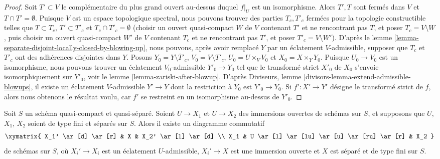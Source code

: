 \begin{proof}
Soit $T' \subset V$ le complémentaire du plus grand ouvert au-dessus duquel
$f|_U$ est un isomorphisme. Alors $T', T$ sont fermés dans $V$ et
$T \cap T' = \emptyset$. Puisque $V$ est un espace topologique
spectral, nous pouvons trouver des parties $T_c, T'_c$ fermées pour la topologie constructible
telles que $T \subset T_c$, $T' \subset T'_c$ et
$T_c \cap T'_c = \emptyset$ (choisir un ouvert quasi-compact
$W$ de $V$ contenant $T'$ et ne rencontrant pas $T$,
et poser $T_c = V \setminus W$, puis choisir un ouvert quasi-compact
$W'$ de $V$ contenant $T_c$ et ne rencontrant pas $T'$,
et poser $T'_c = V \setminus W'$).
D'après le lemme \ref{lemma-separate-disjoint-locally-closed-by-blowing-up},
nous pouvons, après avoir remplacé $Y$ par un éclatement $V$-admissible,
supposer que $T_c$ et $T'_c$ ont des adhérences disjointes dans $Y$.
Posons $Y_0 = Y \setminus \overline{T}'_c$, $V_0 = V \setminus T'_c$,
$U_0 = U \times_V V_0$ et $X_0 = X \times_Y Y_0$.
Puisque $U_0 \to V_0$ est un isomorphisme, nous pouvons trouver un
éclatement $V_0$-admissible $Y'_0 \to Y_0$ tel que le
transformé strict $X'_0$ de $X_0$ s'envoie isomorphiquement sur $Y'_0$, voir
le lemme \ref{lemma-zariski-after-blowup}.
D'après Diviseurs, lemme \ref{divisors-lemma-extend-admissible-blowups},
il existe un éclatement $V$-admissible $Y' \to Y$ dont la restriction
à $Y_0$ est $Y'_0 \to Y_0$. Si $f' : X' \to Y'$ désigne le
transformé strict de $f$, alors nous obtenons le résultat voulu, car
$f'$ se restreint en un isomorphisme au-dessus de $Y'_0$.
\end{proof}

\begin{lemma}
\label{lemma-find-common-blowups}
Soit $S$ un schéma quasi-compact et quasi-séparé.
Soient $U \to X_1$ et $U \to X_2$ des immersions ouvertes
de schémas sur $S$, et supposons que $U$, $X_1$, $X_2$ soient de type
fini et séparés sur $S$. Alors il existe un diagramme commutatif
$$
\xymatrix{
X_1' \ar[d] \ar[r] & X & X_2' \ar[l] \ar[d] \\
X_1 & U \ar[l] \ar[lu] \ar[u] \ar[ru] \ar[r] & X_2
}
$$
de schémas sur $S$, où $X_i' \to X_i$ est un éclatement $U$-admissible,
$X_i' \to X$ est une immersion ouverte et $X$ est séparé et de
type fini sur $S$.
\end{lemma}

